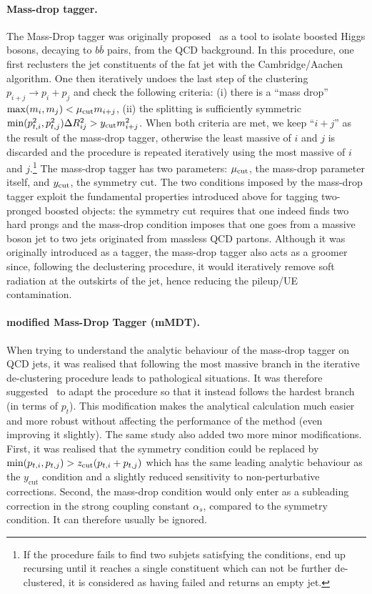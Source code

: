 \paragraph{Mass-drop tagger.} The Mass-Drop
tagger was originally proposed~\cite{Butterworth:2008iy} as a tool to
isolate boosted Higgs bosons, decaying to $b\bar b$ pairs, from the
QCD background. 
In this procedure, one first reclusters the jet constituents of the fat
jet with the Cambridge/Aachen algorithm. One then iteratively undoes
the last step of the clustering $p_{i+j}\to p_i+p_j$ and check the
following criteria: (i) there is a ``mass drop'' \ie
${\rm max}(m_i,m_j)<\mu_{\rm cut}m_{i+j}$, (ii) the splitting is
sufficiently symmetric \ie
${\rm min}(p_{t,i}^2,p_{t,j}^2)\Delta R_{ij}^2>y_{\rm cut} m_{i+j}^2$.
When both criteria are met, we keep ``$i+j$'' as the result of the
mass-drop tagger, otherwise the least massive of $i$ and $j$ is
discarded and the procedure is repeated iteratively using the most
massive of $i$ and $j$.\footnote{If the procedure fails to find two
  subjets satisfying the conditions, \ie end up recursing until it
  reaches a single constituent which can not be further de-clustered,
  it is considered as having failed and returns an empty jet.}
%
The mass-drop tagger has two parameters: $\mu_{\rm cut}$, the
mass-drop parameter itself, and $y_{\rm cut}$, the symmetry cut.
%
The two conditions imposed by the mass-drop tagger exploit the
fundamental properties introduced above for tagging two-pronged
boosted objects: the symmetry cut requires that one indeed finds two
hard prongs and the mass-drop condition imposes that one goes from a
massive boson jet to two jets originated from massless QCD partons.
% 
Although it was originally introduced as a tagger, the mass-drop
tagger also acts as a groomer since, following the declustering
procedure, it would iteratively remove soft radiation at the
outskirts of the jet, hence reducing the pileup/UE contamination.

\paragraph{modified Mass-Drop Tagger (mMDT).} When trying to understand the
analytic behaviour of the mass-drop tagger on QCD jets, it was
realised that following the most massive branch in the iterative
de-clustering procedure leads to pathological situations. It was
therefore suggested~\cite{Dasgupta:2013ihk} to adapt the procedure so
that it instead follows the hardest branch (in terms of $p_t$).
%
This modification makes the analytical calculation much easier and
more robust without affecting the performance of the method (even
improving it slightly).
%
The same study also added two more minor modifications. First, it was
realised that the symmetry condition could be replaced by
${\rm min}(p_{t,i},p_{t,j})>z_{\rm cut}(p_{t,i}+p_{t,j})$ which has
the same leading analytic behaviour as the $y_{\text{cut}}$ condition
and a slightly reduced sensitivity to non-perturbative
corrections. Second, the mass-drop condition would only enter as a
subleading correction in the strong coupling constant $\alpha_s$,
compared to the symmetry condition. It can therefore usually be
ignored.


